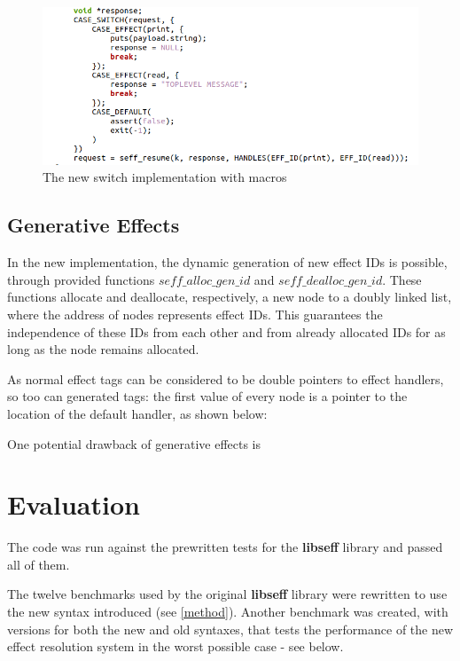 \documentclass[logo,bsc,singlespacing,parskip,online]{infthesis}
\begin{document}
\begin{figure}[h]
    \centering
    \includegraphics[width=1\linewidth]{newswitch.png}
    \caption{The new switch implementation with macros}
    \label{fig:newswitch}
\end{figure}



\section{Generative Effects}

In the new implementation, the dynamic generation of new effect IDs is possible, through provided functions $seff\_alloc\_gen\_id$ and $seff\_dealloc\_gen\_id$. These functions allocate and deallocate, respectively, a new node to a doubly linked list, where the address of nodes represents effect IDs. This guarantees the independence of these IDs from each other and from already allocated IDs for as long as the node remains allocated.

As normal effect tags can be considered to be double pointers to effect handlers, so too can generated tags: the first value of every node is a pointer to the location of the default handler, as shown below:\todo

One potential drawback of generative effects is 





\chapter{Evaluation}

The code was run against the prewritten tests for the \textbf{libseff} library and passed all of them.

The twelve benchmarks used by the original \textbf{libseff} library were rewritten to use the new syntax introduced (see \cref{method}). Another benchmark was created, with versions for both the new and old syntaxes, that tests the performance of the new effect resolution system in the worst possible case - see below. 
\end{document}
